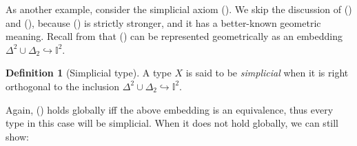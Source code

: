 \documentclass[a4paper,12pt]{amsart}
\theoremstyle{definition}
\newtheorem{definition}[theorem]{Definition}
\newcommand{\mbb}[1]{\mathbb{#1}}
\newcommand{\I}{\mbb I}
\newcommand{\hook}{\hookrightarrow}
\begin{document}
As another example, consider the simplicial axiom (\AxiomSL). We skip the discussion of (\AxiomL) and (\AxiomCL), because (\AxiomSL) is strictly stronger, and it has a better-known geometric meaning. Recall from  that (\AxiomSL) can be represented geometrically as an embedding $\Delta^2\cup\Delta_2 \hook \I^2$.

\begin{definition}[Simplicial type]
  A type $X$ is said to be \emph{simplicial} when it is right orthogonal to the inclusion $\Delta^2 \cup \Delta_2 \hook \I^2$.
\end{definition}

Again, (\AxiomSL) holds globally iff the above embedding is an equivalence, thus every type in this case will be simplicial. When it does not hold globally, we can still show:
\end{document}
